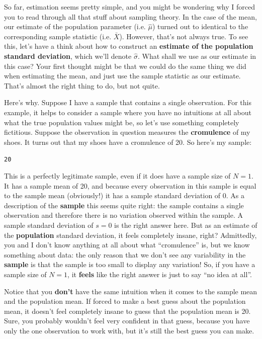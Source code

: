 \documentclass[]{book}
\begin{document}
So far, estimation seems pretty simple, and you might be wondering why I forced you to read through all that stuff about sampling theory. In the case of the mean, our estimate of the population parameter (i.e. \(\hat\mu\)) turned out to identical to the corresponding sample statistic (i.e. \(\bar{X}\)). However, that's not always true. To see this, let's have a think about how to construct an \textbf{estimate of the population standard deviation}, which we'll denote \(\hat\sigma\). What shall we use as our estimate in this case? Your first thought might be that we could do the same thing we did when estimating the mean, and just use the sample statistic as our estimate. That's almost the right thing to do, but not quite.

Here's why. Suppose I have a sample that contains a single observation. For this example, it helps to consider a sample where you have no intuitions at all about what the true population values might be, so let's use something completely fictitious. Suppose the observation in question measures the \textbf{cromulence} of my shoes. It turns out that my shoes have a cromulence of 20. So here's my sample:

\texttt{20}

This is a perfectly legitimate sample, even if it does have a sample size of \(N=1\). It has a sample mean of 20, and because every observation in this sample is equal to the sample mean (obviously!) it has a sample standard deviation of 0. As a description of the \textbf{sample} this seems quite right: the sample contains a single observation and therefore there is no variation observed within the sample. A sample standard deviation of \(s = 0\) is the right answer here. But as an estimate of the \textbf{population} standard deviation, it feels completely insane, right? Admittedly, you and I don't know anything at all about what ``cromulence'' is, but we know something about data: the only reason that we don't see any variability in the \textbf{sample} is that the sample is too small to display any variation! So, if you have a sample size of \(N=1\), it \textbf{feels} like the right answer is just to say ``no idea at all''.

Notice that you \textbf{don't} have the same intuition when it comes to the sample mean and the population mean. If forced to make a best guess about the population mean, it doesn't feel completely insane to guess that the population mean is 20. Sure, you probably wouldn't feel very confident in that guess, because you have only the one observation to work with, but it's still the best guess you can make.
\end{document}
